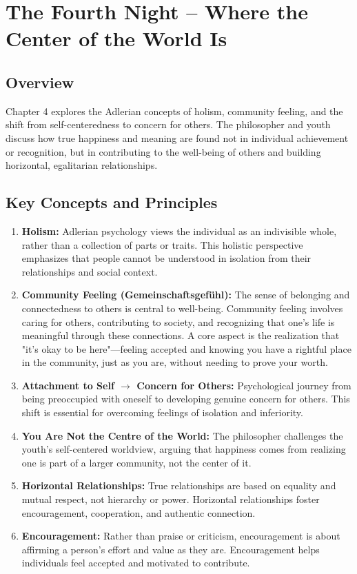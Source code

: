 \section{The Fourth Night – Where the Center of the World Is}

\subsection*{Overview}
Chapter 4 explores the Adlerian concepts of holism, community feeling, and the shift from self-centeredness to concern for others. The philosopher and youth discuss how true happiness and meaning are found not in individual achievement or recognition, but in contributing to the well-being of others and building horizontal, egalitarian relationships.

\subsection*{Key Concepts and Principles}
\begin{enumerate}
    \item \textbf{Holism:} Adlerian psychology views the individual as an indivisible whole, rather than a collection of parts or traits. This holistic perspective emphasizes that people cannot be understood in isolation from their relationships and social context.
    \item \textbf{Community Feeling (Gemeinschaftsgefühl):} The sense of belonging and connectedness to others is central to well-being. Community feeling involves caring for others, contributing to society, and recognizing that one’s life is meaningful through these connections. A core aspect is the realization that "it's okay to be here"—feeling accepted and knowing you have a rightful place in the community, just as you are, without needing to prove your worth.
    \item \textbf{Attachment to Self $\rightarrow$ Concern for Others:} Psychological journey from being preoccupied with oneself to developing genuine concern for others. This shift is essential for overcoming feelings of isolation and inferiority.
    \item \textbf{You Are Not the Centre of the World:} The philosopher challenges the youth’s self-centered worldview, arguing that happiness comes from realizing one is part of a larger community, not the center of it.
    \item \textbf{Horizontal Relationships:} True relationships are based on equality and mutual respect, not hierarchy or power. Horizontal relationships foster encouragement, cooperation, and authentic connection.
    \item \textbf{Encouragement:} Rather than praise or criticism, encouragement is about affirming a person’s effort and value as they are. Encouragement helps individuals feel accepted and motivated to contribute.
\end{enumerate}

